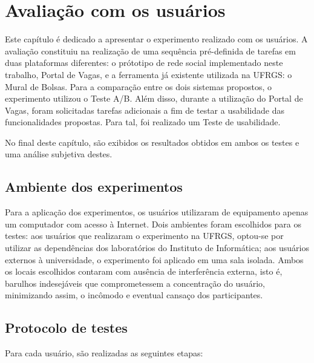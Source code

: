 \chapter{Avaliação com os usuários}
\label{Avaliação}

Este capítulo é dedicado a apresentar o experimento realizado com os usuários.  A avaliação constituiu na realização de uma sequência pré-definida de tarefas em duas plataformas diferentes: o prótotipo de rede social implementado neste trabalho, Portal de Vagas, e a ferramenta já existente utilizada na UFRGS: o Mural de Bolsas. Para a comparação entre os dois sistemas propostos, o experimento utilizou o Teste A/B. Além disso, durante a utilização do Portal de Vagas, foram solicitadas tarefas adicionais a fim de testar a usabilidade das funcionalidades propostas. Para tal, foi realizado um Teste de usabilidade.

No final deste capítulo, são exibidos os resultados obtidos em ambos os testes e uma análise subjetiva destes.

\section{Ambiente dos experimentos}
\label{avaliacaoAmbiente}

Para a aplicação dos experimentos, os usuários utilizaram de equipamento apenas um computador com acesso à Internet. Dois ambientes foram escolhidos para os testes: aos usuários que realizaram o experimento na UFRGS, optou-se por utilizar as dependências dos laboratórios do Instituto de Informática; aos usuários externos à universidade, o experimento foi aplicado em uma sala isolada. Ambos os locais escolhidos contaram com ausência de interferência externa, isto é, barulhos indesejáveis que comprometessem a concentração do usuário, minimizando assim, o incômodo e eventual cansaço dos participantes.

\section{Protocolo de testes}
\label{avaliacaoProtocolo}

Para cada usuário, são realizadas as seguintes etapas:

